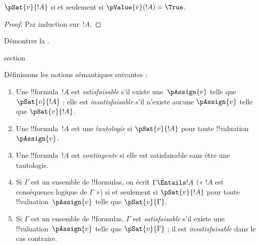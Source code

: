 \documentclass[11pt,a4paper,openany]{memoir}
\begin{document}
\begin{prop}
  $\pSat{v}{!A}$ si et seulement si $\pValue{v}(!A) = \True$.
\end{prop}

\begin{proof}
  Par induction sur~$!A$.
\end{proof}

\begin{prob}
  Démontrer la .
\end{prob}


\endgroup



\begingroup
\expandafter\def\csname ol@sectioncs\endcsname{section}
\def\olfilename{semantic-notions}




Définissons les notions sémantiques suivantes :

\begin{defn}
\begin{enumerate}
\item Une !!{formula}~$!A$ est \emph{satisfaisable} s'il existe
  une~$\pAssign{v}$ telle que $\pSat{v}{!A}$ ; elle est
  \emph{insatisfaisable} s'il n'existe aucune $\pAssign{v}$ telle
  que $\pSat{v}{!A}$.
\item Une !!{formula}~$!A$ est une \emph{tautologie} si
  $\pSat{v}{!A}$ pour toute !!{valuation}~$\pAssign{v}$.
\item Une !!{formula}~$!A$ est \emph{contingente} si elle est
  satisfaisable sans être une tautologie.
\item Si $\Gamma$ est un ensemble de !!{formula}s, on écrit
  $\Gamma \Entails !A$ (« $!A$ est conséquence logique de $\Gamma$ »)
  si et seulement si $\pSat{v}{!A}$ pour toute
  !!{valuation}~$\pAssign{v}$ telle que $\pSat{v}{\Gamma}$.
\item Si $\Gamma$ est un ensemble de !!{formula}s, $\Gamma$ est
  \emph{satisfaisable} s'il existe une !!{valuation}~$\pAssign{v}$
  telle que $\pSat{v}{\Gamma}$ ; il est \emph{insatisfaisable}
  dans le cas contraire.
\end{enumerate}
\end{defn}
\end{document}
